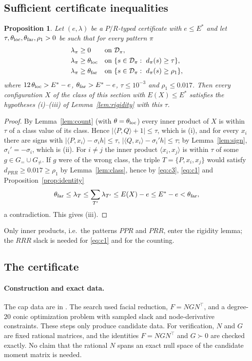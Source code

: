 \documentclass[11pt]{article}
\newtheorem{proposition}[theorem]{Proposition}
\theoremstyle{definition}
\newcommand{\ip}[2]{\langle #1,#2\rangle}
\newcommand{\Es}{E^{\ast}}
\begin{document}
\subsection{Sufficient certificate inequalities}
\begin{proposition}\label{prop:cap}
Let $(e,\lambda)$ be a $P/R$-typed certificate with $e\le\Es$ and let $\tau,\theta_{\rm loc},\theta_{\rm far},\rho_1>0$ be
such that for every pattern $\pi$
\begin{align}
 \lambda_\pi&\ge0 &&\text{on }\mathcal D_\pi, \label{eq:c1}\\
 \lambda_\pi&\ge\theta_{\rm loc} &&\text{on }\{s\in\mathcal D_\pi:\ d_\pi(s)\ge\tau\}, \label{eq:c2}\\
 \lambda_\pi&\ge\theta_{\rm far} &&\text{on }\{s\in\mathcal D_\pi:\ d_\pi(s)\ge\rho_1\}, \label{eq:c3}
\end{align}
where $12\,\theta_{\rm loc}>\Es-e$, $\theta_{\rm far}>\Es-e$, $\tau\le10^{-3}$ and $\rho_1\le0.017$. Then every configuration
$X$ of the class of this section with $E(X)\le\Es$ satisfies the hypotheses (i)--(iii) of Lemma~\ref{lem:rigidity} with
this $\tau$.
\end{proposition}
\begin{proof}
By Lemma~\ref{lem:count} (with $\theta=\theta_{\rm loc}$) every inner product of $X$ is within $\tau$ of a class value of
its class. Hence $|\ip PQ+1|\le\tau$, which is (i), and for every $x_i$ there are signs with
$|\ip P{x_i}-\sigma_ih|\le\tau$, $|\ip Q{x_i}-\sigma_i'h|\le\tau$; by Lemma~\ref{lem:sign}, $\sigma_i'=-\sigma_i$, which is
(ii). For $i\ne j$ the inner product $\ip{x_i}{x_j}$ is within $\tau$ of some $g\in G_=\cup G_{\ne}$. If $g$ were of the wrong
class, the triple $T=\{P,x_i,x_j\}$ would satisfy $d_{PRR}\ge0.017\ge\rho_1$ by Lemma~\ref{lem:class}, hence by
\eqref{eq:c3}, \eqref{eq:c1} and Proposition~\ref{prop:identity}
\[
 \theta_{\rm far}\le\lambda_T\le\sum_{T'}\lambda_{T'}\le E(X)-e\le\Es-e<\theta_{\rm far},
\]
a contradiction. This gives (iii).
\end{proof}
Only inner products, i.e.\ the patterns $PPR$ and $PRR$, enter the rigidity lemma; the $RRR$ slack is needed for
\eqref{eq:c1} and for the counting.



\subsection{The certificate}\label{sec:capcert}
\paragraph{Construction and exact data.}
The cap data are in . The search used facial reduction,
$F=NGN^\top$, and a degree-$20$ conic optimization problem with sampled slack and
node-derivative constraints. These steps only produce candidate data. For verification, $N$ and $G$ are fixed rational
matrices, and the identities $F=NGN^\top$ and $G\succ0$ are checked exactly. No claim that the rational $N$ spans an
exact null space of the candidate moment matrix is needed.
\end{document}
